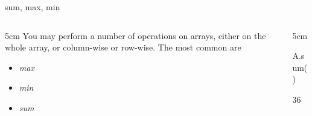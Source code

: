 \documentclass[hyperref={pdfpagelabels=false},table]{beamer}
\begin{document}
\begin{frame}[fragile]{sum, max, min}
\begin{columns}
\begin{column}{5cm}
You may perform a number of operations on arrays, either on the whole array, or column-wise or row-wise. The most common are
\begin{itemize}
\item\alert{\textit{max}}
\item \alert{\textit{min}}
\item \alert{\textit{sum}}
\end{itemize}
\end{column}
\begin{column}{5cm}
\begin{example}
\begin{python}
A.sum()
\end{python}
36
\end{example}
\end{column}
\end{columns}
\end{frame}
\end{document}
